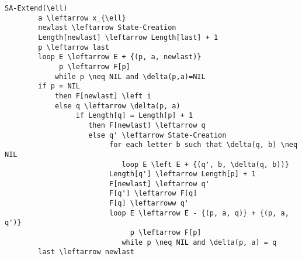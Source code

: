 \documentclass[UTF8]{ctexart}
\theoremstyle{definition}
\theoremstyle{remark}
\numberwithin{equation}{subsection}
\begin{document}
	\begin{lstlisting}[frame=shadowbox,framexleftmargin=5mm,rulesepcolor=\color{gray},numbers=none]
		SA-Extend(\ell)
		a \leftarrow x_{\ell}
		newlast \leftarrow State-Creation
		Length[newlast] \leftarrow Length[last] + 1
		p \leftarrow last
		loop E \leftarrow E + {(p, a, newlast)}
			 p \leftarrow F[p]
			while p \neq NIL and \delta(p,a)=NIL
		if p = NIL
			then F[newlast] \left i
			else q \leftarrow \delta(p, a)
				 if Length[q] = Length[p] + 1
					then F[newlast] \leftarrow q
					else q' \leftarrow State-Creation
						 for each letter b such that \delta(q, b) \neq NIL
							loop E \left E + {(q', b, \delta(q, b))}
						 Length[q'] \leftarrow Length[p] + 1
						 F[newlast] \leftarrow q'
						 F[q'] \leftarrow F[q]
						 F[q] \leftarroww q'
						 loop E \leftarrow E - {(p, a, q)} + {(p, a, q')}
							  p \leftarrow F[p]
							while p \neq NIL and \delta(p, a) = q
		last \leftarrow newlast
	\end{lstlisting}
	
\end{document}
